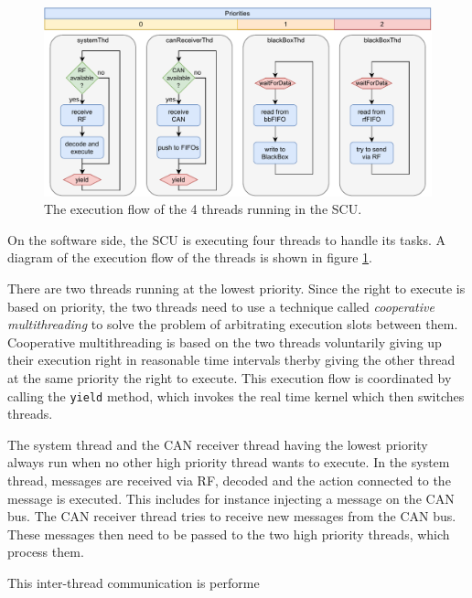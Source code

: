\documentclass[conference]{IEEEtran}
\begin{document}
\begin{figure}
    \centering
    \includegraphics[width=\linewidth]{documentation/images/SCU_threads.pdf}
    \caption{The execution flow of the 4 threads running in the SCU.}
    \label{fig:SCU_threads}
\end{figure}

On the software side, the SCU is executing four threads to handle its tasks. A diagram of the execution flow of the threads is shown in figure \ref{fig:SCU_threads}. 

There are two threads running at the lowest priority. Since the right to execute is based on priority, the two threads need to use a technique called \textit{cooperative multithreading} to solve the problem of arbitrating execution slots between them. Cooperative multithreading is based on the two threads voluntarily giving up their execution right in reasonable time intervals therby giving the other thread at the same priority the right to execute. This execution flow is coordinated by calling the \texttt{yield} method, which invokes the real time kernel which then switches threads. 

The system thread and the CAN receiver thread having the lowest priority always run when no other high priority thread wants to execute. In the system thread, messages are received via RF, decoded and the action connected to the message is executed. This includes for instance injecting a message on the CAN bus. The CAN receiver thread tries to receive new messages from the CAN bus. These messages then need to be passed to the two high priority threads, which process them.

This inter-thread communication is performe

\end{document}

